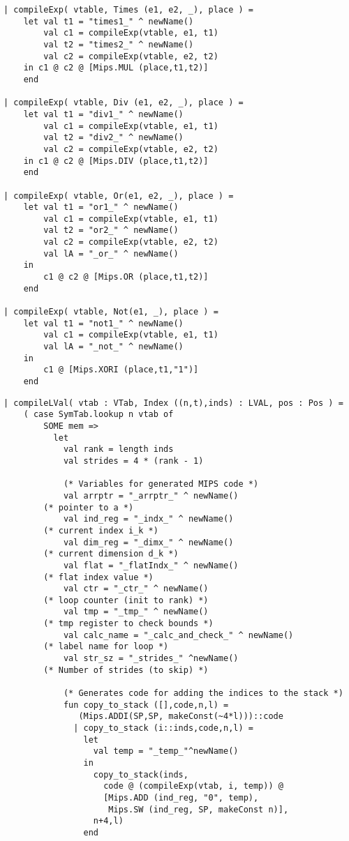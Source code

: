 \documentclass[12pt,a4paper,english]{article}
\begin{document}
\begin{lstlisting}[caption=The compiler.sml changes for task 2.]
| compileExp( vtable, Times (e1, e2, _), place ) =
    let val t1 = "times1_" ^ newName()
        val c1 = compileExp(vtable, e1, t1)
        val t2 = "times2_" ^ newName()
        val c2 = compileExp(vtable, e2, t2)
    in c1 @ c2 @ [Mips.MUL (place,t1,t2)]
    end

| compileExp( vtable, Div (e1, e2, _), place ) =
    let val t1 = "div1_" ^ newName()
        val c1 = compileExp(vtable, e1, t1)
        val t2 = "div2_" ^ newName()
        val c2 = compileExp(vtable, e2, t2)
    in c1 @ c2 @ [Mips.DIV (place,t1,t2)]
    end

| compileExp( vtable, Or(e1, e2, _), place ) =
    let val t1 = "or1_" ^ newName()
        val c1 = compileExp(vtable, e1, t1)
        val t2 = "or2_" ^ newName()
        val c2 = compileExp(vtable, e2, t2)
        val lA = "_or_" ^ newName()
    in 
        c1 @ c2 @ [Mips.OR (place,t1,t2)]
    end
        
| compileExp( vtable, Not(e1, _), place ) =
    let val t1 = "not1_" ^ newName()
        val c1 = compileExp(vtable, e1, t1)
        val lA = "_not_" ^ newName()
    in 
        c1 @ [Mips.XORI (place,t1,"1")]
    end
\end{lstlisting}
\newpage
\begin{lstlisting}[caption=Compiler.sml for Task 4.]
| compileLVal( vtab : VTab, Index ((n,t),inds) : LVAL, pos : Pos ) =
    ( case SymTab.lookup n vtab of
        SOME mem => 
          let
            val rank = length inds
            val strides = 4 * (rank - 1)
                
            (* Variables for generated MIPS code *)
            val arrptr = "_arrptr_" ^ newName() 
		(* pointer to a *)
            val ind_reg = "_indx_" ^ newName() 
		(* current index i_k *)
            val dim_reg = "_dimx_" ^ newName() 
		(* current dimension d_k *)
            val flat = "_flatIndx_" ^ newName() 
		(* flat index value *)
            val ctr = "_ctr_" ^ newName() 
		(* loop counter (init to rank) *)
            val tmp = "_tmp_" ^ newName() 
		(* tmp register to check bounds *)
            val calc_name = "_calc_and_check_" ^ newName() 
		(* label name for loop *)
            val str_sz = "_strides_" ^newName() 
		(* Number of strides (to skip) *)

            (* Generates code for adding the indices to the stack *)
            fun copy_to_stack ([],code,n,l) = 
			   (Mips.ADDI(SP,SP, makeConst(~4*l)))::code 
              | copy_to_stack (i::inds,code,n,l) = 
                let 
                  val temp = "_temp_"^newName()
                in
                  copy_to_stack(inds, 
                    code @ (compileExp(vtab, i, temp)) @
                    [Mips.ADD (ind_reg, "0", temp),
                     Mips.SW (ind_reg, SP, makeConst n)], 
                  n+4,l)  
                end
\end{lstlisting}
\end{document}
